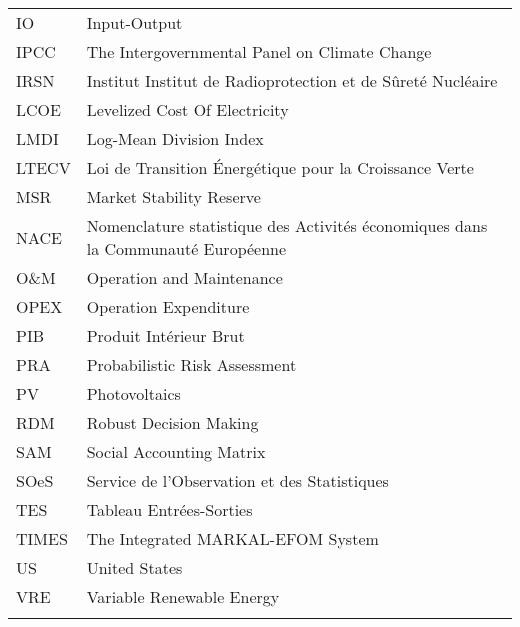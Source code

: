 \begin{tabular}{ p{} p{} }

IO & Input-Output \\
IPCC & The Intergovernmental Panel on Climate Change \\
IRSN & Institut Institut de Radioprotection et de Sûreté Nucléaire \\
LCOE & Levelized Cost Of Electricity \\
LMDI & Log-Mean Division Index  \\
LTECV & Loi de Transition Énergétique pour la Croissance Verte \\
MSR & Market Stability Reserve \\
NACE & Nomenclature statistique des Activités économiques dans la Communauté Européenne \\
O\&M & Operation and Maintenance \\
OPEX & Operation Expenditure \\
PIB & Produit Intérieur Brut  \\
PRA & Probabilistic Risk Assessment \\
PV & Photovoltaics \\
RDM & Robust Decision Making  \\
SAM & Social Accounting Matrix \\
SOeS & Service de l'Observation et des Statistiques \\
TES & Tableau Entrées-Sorties \\
TIMES & The Integrated MARKAL-EFOM System \\
US & United States \\
VRE & Variable Renewable Energy \\
\tabularnewline
\end{tabular}
